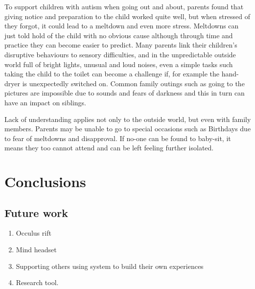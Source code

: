 \documentclass[11pt]{report}
\begin{document}
To support children with autism when going out and about, parents found that giving notice and preparation to the child worked quite well, but when stressed of they forgot, it could lead to a meltdown and even more stress\cite{meltdowns_goingout}. Meltdowns can just told hold of the child with no obvious cause although through time and practice they can become easier to predict. Many parents link their children's disruptive behaviours to sensory difficulties, and in the unpredictable outside world full of bright lights, unusual and loud noises, even a simple tasks such taking the child to the toilet can become a challenge if, for example the hand-dryer is unexpectedly switched on\cite{meltdowns_goingout}. Common family outings such as going to the pictures are impossible due to sounds and fears of darkness and this in turn can have an impact on siblings.  

Lack of understanding applies not only to the outside world, but even with family members\cite{meltdowns_goingout}. Parents may be unable to go to special occasions such as Birthdays due to fear of meltdowns and disapproval. If no-one can be found to baby-sit, it means they too cannot attend and can be left feeling further isolated.

\chapter{Conclusions}

\section{Future work}

\begin{enumerate}
\item Occulus rift
\item Mind headset
\item Supporting others using system to build their own experiences
\item Research tool.
\end{enumerate}
\end{document}
